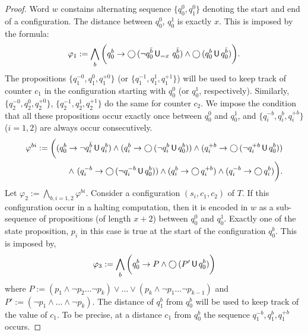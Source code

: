 \documentclass{llncs}
\newcommand{\Next}{\bigcirc \, }
\newcommand{\Until}{\mbox{$\, {\sf U}\,$}}
\newcommand{\U}{\Until}
\newcommand{\X}{\Next}
\begin{document}
\begin{proof}
Word $w$ constains alternating sequence $\{q_0^0,q_1^0\}$ denoting the start and end of a configuration. The distance
between $q_0^0$, $q_0^1$ is exactly $x$. This is imposed by the formula:
\[
 \varphi_1 :=  \bigwedge_{b}\bigg(q_0^b \to \X(\neg q_0^{\bar b} \U\!_{=x}\ q_0^{\bar b}) \wedge \X(q_0^b\U q_0^{\bar b})\bigg).
\] The propositions $\{q_1^{-0},q_1^{0},q_1^{+0}\}$ (or $\{q_1^{-1},q_1^{1},q_1^{+1}\}$) will be used to keep track of counter $c_1$ in the configuration
starting with $q_0^0$ (or $q_0^1$, respectively). Similarly, $\{q_2^{-0},q_2^{0},q_2^{+0}\}$, $\{q_2^{-1},q_2^{1},q_2^{+1}\}$ do the same for counter $c_2$. We impose 
the condition that all these propositions occur exactly once between $q_0^0$ and $q_0^1$, and $\{q_i^{-b},q_i^{b},q_i^{+b}\}$ ($i=1,2$) are always
occur consecutively.
\begin{align*}
 \varphi^{bi}:= \bigg( (q_0^b\to \neg q_i^{\bar b}\U q^b_i)\wedge (q_i^b\to \X(\neg q_i^b\U q_0^b)) \wedge (q_i^{+b}\to\X(\neg q_i^{+b}\U q_0^{b}))\\
                \wedge\ (q_i^{-b}\to\X(\neg q_i^{-b}\U q_0^{b})) \wedge (q_i^b \to \X q_i^{+b}) \wedge (q_i^{-b} \to \X q_i^b)\bigg).
  \end{align*} 
Let $\varphi_2:= \bigwedge_{b,i=1,2}\varphi^{bi}$.  
Consider a configuration $(s_i,c_1,c_2)$ of $T$. If this configuration occur in a halting computation, then it is encoded in $w$ as a sub-sequence  of propositions (of length $x+2$) between $q_0^0$ and $q_0^1$.
Exactly one of the state proposition, $p_i$ in this case is true at the start of the configuration $q_0^b$. This is  imposed by,
\[
 \varphi_3 := \bigwedge_b\bigg(q_0^b\to P \wedge \X(P'\U q_0^b)\bigg)
\] where $P:= (p_1\wedge \neg p_2 \hdots \neg p_k) \vee \hdots \vee (p_k \wedge \neg p_1 \hdots \neg p_{k-1})$ and 
$P':= (\neg p_1\wedge\hdots\wedge \neg p_k)$. 
The distance of $q_1^b$ from $q_0^b$ will be used
to keep track of the value of $c_1$. To be precise, at a distance $c_1$ from $q_0^b$ the sequence $q_1^{-b},q_1^{b},q_1^{+b}$ occurs.


\end{proof}
\end{document}
